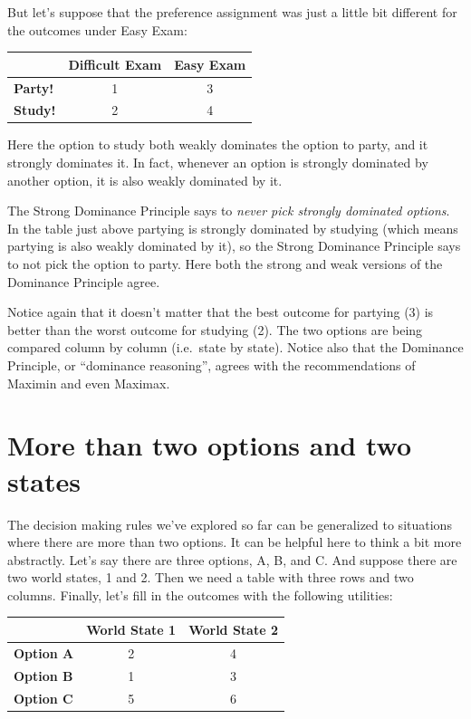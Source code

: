 \documentclass[]{tufte-book}
\begin{document}
But let's suppose that the preference assignment was just a little bit different for the outcomes under Easy Exam:

\begin{longtable}[]{@{}lcc@{}}
\toprule
& Difficult Exam & Easy Exam\tabularnewline
\midrule
\endhead
\textbf{Party!} & 1 & 3\tabularnewline
\textbf{Study!} & 2 & 4\tabularnewline
\bottomrule
\end{longtable}

Here the option to study both weakly dominates the option to party, and it strongly dominates it. In fact, whenever an option is strongly dominated by another option, it is also weakly dominated by it.

The Strong Dominance Principle says to \emph{never pick strongly dominated options}. In the table just above partying is strongly dominated by studying (which means partying is also weakly dominated by it), so the Strong Dominance Principle says to not pick the option to party. Here both the strong and weak versions of the Dominance Principle agree.

Notice again that it doesn't matter that the best outcome for partying (3) is better than the worst outcome for studying (2). The two options are being compared column by column (i.e.~state by state). Notice also that the Dominance Principle, or ``dominance reasoning'', agrees with the recommendations of Maximin and even Maximax.

\hypertarget{more-than-two-options-and-two-states}{%
\section{More than two options and two states}\label{more-than-two-options-and-two-states}}

The decision making rules we've explored so far can be generalized to situations where there are more than two options. It can be helpful here to think a bit more abstractly. Let's say there are three options, A, B, and C. And suppose there are two world states, 1 and 2. Then we need a table with three rows and two columns. Finally, let's fill in the outcomes with the following utilities:

\begin{longtable}[]{@{}lcc@{}}
\toprule
& World State 1 & World State 2\tabularnewline
\midrule
\endhead
\textbf{Option A} & 2 & 4\tabularnewline
\textbf{Option B} & 1 & 3\tabularnewline
\textbf{Option C} & 5 & 6\tabularnewline
\bottomrule
\end{longtable}
\end{document}
